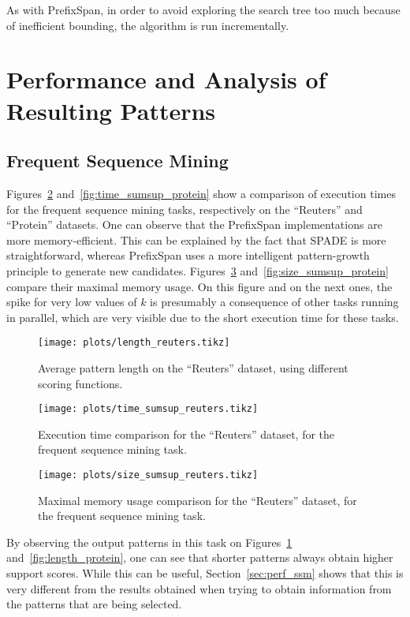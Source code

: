 \documentclass{sigkddExp}
\newcommand{\ps}{\textsf{PrefixSpan}}
\newcommand{\spade}{\textsf{SPADE}}
\begin{document}
As with \ps, in order to avoid exploring the search tree too much because of inefficient bounding, the algorithm is run incrementally.

\section{Performance and Analysis of Resulting Patterns}
\subsection{Frequent Sequence Mining}
\label{sec:perf_fsm}
Figures~\ref{fig:time_sumsup_reuters} and~\ref{fig:time_sumsup_protein} show a comparison of execution times for the frequent sequence mining tasks, respectively on the ``Reuters'' and ``Protein'' datasets.
One can observe that the \ps{} implementations are more memory-efficient.
This can be explained by the fact that \spade{} is more straightforward, whereas \ps{} uses a more intelligent pattern-growth principle to generate new candidates.
Figures~\ref{fig:size_sumsup_reuters} and~\ref{fig:size_sumsup_protein} compare their maximal memory usage.
On this figure and on the next ones, the spike for very low values of \(k\) is presumably a consequence of other tasks running in parallel, which are very visible due to the short execution time for these tasks.
\begin{figure}[!hbtp]
	\centering
	\texttt{[image: plots/length\_reuters.tikz]}
	\caption{Average pattern length on the ``Reuters'' dataset, using different scoring functions.}
	\label{fig:length_reuters}
\end{figure}%
\begin{figure}[!hbtp]
	\centering
	\texttt{[image: plots/time\_sumsup\_reuters.tikz]}
	\caption{Execution time comparison for the ``Reuters'' dataset, for the frequent sequence mining task.}
	\label{fig:time_sumsup_reuters}
\end{figure}%
\begin{figure}[!hbtp]
	\centering
	\texttt{[image: plots/size\_sumsup\_reuters.tikz]}
	\caption{Maximal memory usage comparison for the ``Reuters'' dataset, for the frequent sequence mining task.}
	\label{fig:size_sumsup_reuters}
\end{figure}

By observing the output patterns in this task on Figures~\ref{fig:length_reuters} and~\ref{fig:length_protein}, one can see that shorter patterns always obtain higher support scores.
While this can be useful, Section~\ref{sec:perf_ssm} shows that this is very different from the results obtained when trying to obtain information from the patterns that are being selected.
\end{document}
